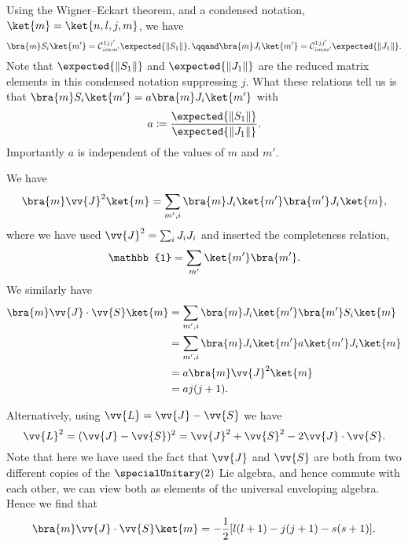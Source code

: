 \documentclass[fleqn]{NotesClass}
\newcommand*{\ident}{\mathbb{1}}
\newcommand*{\clebschgordan}[6]{\mathcal{C}_{#1#2#3}^{#4#5#6}}
\begin{document}
    Using the Wigner--Eckart theorem, and a condensed notation, \(\ket{m} = \ket{n, l, j, m}\), we have
    \begin{equation}
        \bra{m} S_i \ket{m'} = \clebschgordan{i}{m}{m'}{1}{j}{j'} \expected{\|S_1\|}, \qqand \bra{m} J_i \ket{m'} = \clebschgordan{i}{m}{m'}{1}{j}{j'} \expected{\|J_1\|}.
    \end{equation}
    Note that \(\expected{\|S_1\|}\) and \(\expected{\|J_1\|}\) are the reduced matrix elements in this condensed notation suppressing \(j\).
    What these relations tell us is that \(\bra{m}S_i\ket{m'} = a\bra{m}J_i\ket{m'}\) with
    \begin{equation}
        a \coloneqq \frac{\expected{\|S_1\|}}{\expected{\|J_1\|}}.
    \end{equation}
    Importantly \(a\) is independent of the values of \(m\) and \(m'\).
    
    We have
    \begin{equation}
        \bra{m} \vv{J}^2 \ket{m} = \sum_{m', i} \bra{m} J_i \ket{m'} \bra{m'} J_i \ket{m},
    \end{equation}
    where we have used \(\vv{J}^2 = \sum_i J_iJ_i\) and inserted the completeness relation,
    \begin{equation}
        \ident = \sum_{m'} \ket{m'}\bra{m'}.
    \end{equation}
    We similarly have
    \begin{align}
        \bra{m} \vv{J} \cdot \vv{S} \ket{m} &= \sum_{m', i} \bra{m} J_i \ket{m'}\bra{m'} S_i \ket{m}\\
        &= \sum_{m', i} \bra{m} J_i \ket{m'} a\ket{m'} J_i \ket{m}\\
        &= a\bra{m}\vv{J}^2\ket{m}\\
        &= a j(j + 1).
    \end{align}
    
    Alternatively, using \(\vv{L} = \vv{J} - \vv{S}\) we have
    \begin{equation}
        \vv{L}^2 = (\vv{J} - \vv{S})^2 = \vv{J}^2 + \vv{S}^2 - 2\vv{J}\cdot\vv{S}.
    \end{equation}
    Note that here we have used the fact that \(\vv{J}\) and \(\vv{S}\) are both from two different copies of the \(\specialUnitary(2)\) Lie algebra, and hence commute with each other, we can view both as elements of the universal enveloping algebra.
    Hence we find that
    \begin{equation}
        \bra{m} \vv{J} \cdot \vv{S} \ket{m} = -\frac{1}{2}[l(l + 1) - j(j + 1) - s(s + 1)].
    \end{equation}
    
\end{document}
